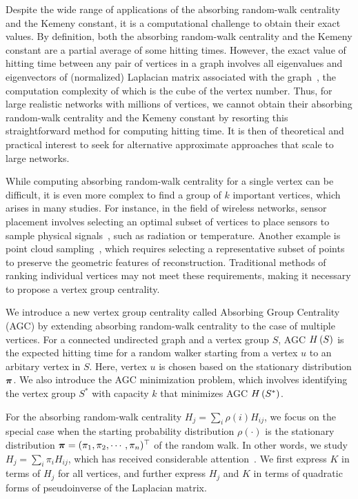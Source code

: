 \documentclass[10pt,twocolumn,twoside]{IEEEtran}
\begin{document}
Despite the wide range of applications of the absorbing random-walk centrality and the Kemeny constant, it is a computational challenge to obtain their exact values.
By definition, both the absorbing random-walk centrality and the Kemeny constant are a partial average of some hitting times.
However, the exact value of hitting time between any pair of vertices in a graph involves all eigenvalues and eigenvectors of (normalized) Laplacian matrix associated with the graph~\cite{Lo93,LiZh13PRE}, the computation complexity of which is the cube of the vertex number.
Thus, for large realistic networks with millions of vertices, we cannot obtain their absorbing random-walk centrality and the Kemeny constant by resorting this straightforward method for computing hitting time.
It is then of theoretical and practical interest to seek for alternative approximate approaches that scale to large networks.

While computing absorbing random-walk centrality for a single vertex can be difficult, it is even more complex to find a group of \(k\) important vertices, which arises in many studies.
For instance, in the field of wireless networks, sensor placement involves selecting an optimal subset of vertices to place sensors to sample physical signals~\cite{KrSiGu08,RaChVe14}, such as radiation or temperature.
Another example is point cloud sampling~\cite{DiChWaBa20,ChTiFeVeKo17}, which requires selecting a representative subset of points to preserve the geometric features of reconstruction.
Traditional methods of ranking individual vertices may not meet these requirements, making it necessary to propose a vertex group centrality.

We introduce a new vertex group centrality called Absorbing Group Centrality (AGC) by extending absorbing random-walk centrality to the case of multiple vertices.
For a connected undirected graph and a vertex group \(S\), AGC \(H\left(S\right)\) is the expected hitting time for a random walker starting from a vertex \(u\) to an arbitary vertex in \(S\). Here, vertex \(u\) is chosen based on the stationary distribution \(\boldsymbol{\pi}\).
We also introduce the AGC minimization problem, which involves identifying the vertex group \(S^*\) with capacity \(k\) that minimizes AGC \(H\left(S^*\right)\).

For the absorbing random-walk centrality \(H_j=\sum_{i} \rho(i) H_{ij}\), we focus on the special case when the starting probability distribution \(\rho(\cdot)\) is the stationary distribution \(\boldsymbol{\pi}=(\pi_1, \pi_2, \cdots, \pi_n)^{\top}\) of the random walk.
In other words, we study \(H_j=\sum_{i} \pi_i H_{ij}\), which has received considerable attention~\cite{TeBeVo09,Be09,Be16}.
We first express \(K\) in terms of \(H_j\) for all vertices, and further express \(H_j\) and \(K\) in terms of quadratic forms of pseudoinverse of the Laplacian matrix.
\end{document}
